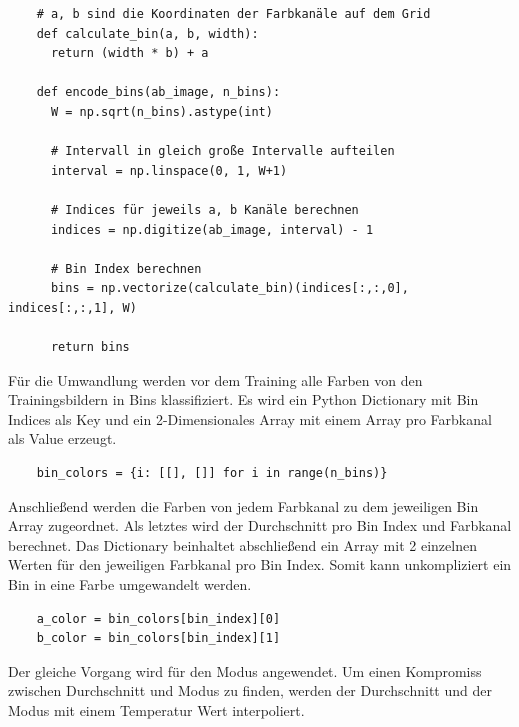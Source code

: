 \begin{listing}[H]
  \begin{verbatim}
    # a, b sind die Koordinaten der Farbkanäle auf dem Grid
    def calculate_bin(a, b, width):
      return (width * b) + a
  
    def encode_bins(ab_image, n_bins):
      W = np.sqrt(n_bins).astype(int)
  
      # Intervall in gleich große Intervalle aufteilen
      interval = np.linspace(0, 1, W+1)
  
      # Indices für jeweils a, b Kanäle berechnen
      indices = np.digitize(ab_image, interval) - 1
  
      # Bin Index berechnen
      bins = np.vectorize(calculate_bin)(indices[:,:,0], indices[:,:,1], W)
  
      return bins
  \end{verbatim}
\end{listing}

Für die Umwandlung werden vor dem Training alle Farben von den Trainingsbildern in Bins klassifiziert. Es wird ein Python Dictionary mit Bin
Indices als Key und ein 2-Dimensionales Array mit einem Array pro Farbkanal als Value erzeugt.

\begin{listing}[H]
  \begin{verbatim}
    bin_colors = {i: [[], []] for i in range(n_bins)}
  \end{verbatim}
\end{listing}

Anschließend werden die Farben von jedem Farbkanal zu dem jeweiligen Bin Array zugeordnet. Als letztes wird der Durchschnitt pro Bin Index
und Farbkanal berechnet. Das Dictionary beinhaltet abschließend ein Array mit 2 einzelnen Werten für den jeweiligen Farbkanal pro Bin Index.
Somit kann unkompliziert ein Bin in eine Farbe umgewandelt werden.

\begin{listing}[H]
  \begin{verbatim}
    a_color = bin_colors[bin_index][0]
    b_color = bin_colors[bin_index][1]
  \end{verbatim}
\end{listing}

Der gleiche Vorgang wird für den Modus angewendet. Um einen Kompromiss zwischen Durchschnitt und Modus zu finden, werden der Durchschnitt 
und der Modus mit einem Temperatur Wert interpoliert.

